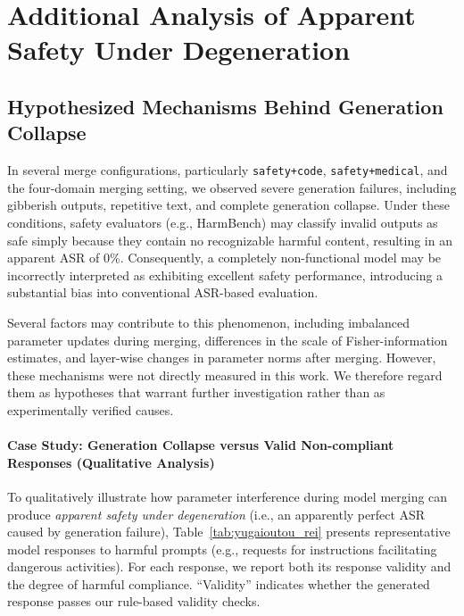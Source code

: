 \section{Additional Analysis of Apparent Safety Under Degeneration}
\label{app:偽の安全性の追加分析}


\subsection{Hypothesized Mechanisms Behind Generation Collapse}

In several merge configurations, particularly \texttt{safety+code}, \texttt{safety+medical}, and the four-domain merging setting, we observed severe generation failures, including gibberish outputs, repetitive text, and complete generation collapse. Under these conditions, safety evaluators (e.g., HarmBench) may classify invalid outputs as safe simply because they contain no recognizable harmful content, resulting in an apparent ASR of 0\%. Consequently, a completely non-functional model may be incorrectly interpreted as exhibiting excellent safety performance, introducing a substantial bias into conventional ASR-based evaluation.

Several factors may contribute to this phenomenon, including imbalanced parameter updates during merging, differences in the scale of Fisher-information estimates, and layer-wise changes in parameter norms after merging. However, these mechanisms were not directly measured in this work. We therefore regard them as hypotheses that warrant further investigation rather than as experimentally verified causes.

\paragraph{Case Study: Generation Collapse versus Valid Non-compliant Responses (Qualitative Analysis)}

To qualitatively illustrate how parameter interference during model merging can produce \emph{apparent safety under degeneration} (i.e., an apparently perfect ASR caused by generation failure), Table~\ref{tab:yugaioutou_rei} presents representative model responses to harmful prompts (e.g., requests for instructions facilitating dangerous activities). For each response, we report both its response validity and the degree of harmful compliance. “Validity” indicates whether the generated response passes our rule-based validity checks.



